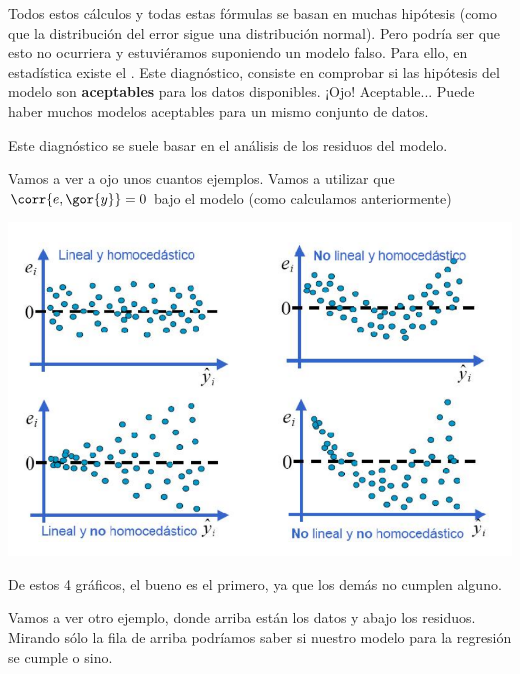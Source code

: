 \begin{itemize}
\begin{example}
\end{example}


\obs Todos estos cálculos y todas estas fórmulas se basan en muchas hipótesis (como que la distribución del error sigue una distribución normal). Pero podría ser que esto no ocurriera y estuviéramos suponiendo un modelo falso. Para ello, en estadística existe el . Este diagnóstico, consiste en comprobar si las hipótesis del modelo son \textbf{aceptables} para los datos disponibles. ¡Ojo! Aceptable... Puede haber muchos modelos aceptables para un mismo conjunto de datos.

Este diagnóstico se suele basar en el análisis de los residuos del modelo.

\begin{example}
	Vamos a ver a ojo unos cuantos ejemplos. Vamos a utilizar que $\corr{e,\gor{y}} = 0$ bajo el modelo (como calculamos anteriormente)

\begin{center}
\includegraphics[scale=0.5]{img/diagmodelo.png}
\end{center}

De estos 4 gráficos, el bueno es el primero, ya que los demás no cumplen alguno.
\end{example}

\begin{example}
Vamos a ver otro ejemplo, donde arriba están los datos y abajo los residuos. Mirando sólo la fila de arriba podríamos saber si nuestro modelo para la regresión se cumple o sino.



\end{example}
\end{itemize}

